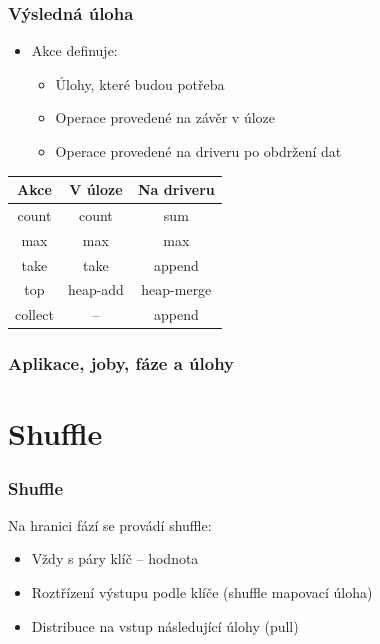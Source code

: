 \documentclass[xcolor=dvipsnames,compact]{beamer}
\begin{document}
\begin{frame}
	\frametitle{Výsledná úloha}
	\begin{itemize}
		\item Akce definuje:
		\begin{itemize}
			\item Úlohy, které budou potřeba
			\item Operace provedené na závěr v úloze
			\item Operace provedené na driveru po obdržení dat
		\end{itemize}
	\end{itemize}
	\begin{table}
		\begin{center}
			\begin{tabularx}{\linewidth}{ C | C | C }
				Akce & V úloze & Na driveru \\
				\hline
				count & count & sum \\
				max & max & max \\
				take & take & append \\
				top & heap-add & heap-merge \\ 
				collect & -- & append
			\end{tabularx}
		\end{center}
	\end{table}
\end{frame}

\begin{frame}
	\frametitle{Aplikace, joby, fáze a úlohy}
	\begin{center}
	\end{center}
\end{frame}

\section{Shuffle}

\begin{frame}
	\frametitle{Shuffle}	
	Na hranici fází se provádí shuffle:
	\begin{itemize}
		\item Vždy s páry klíč -- hodnota
		\item Roztřízení výstupu podle klíče (shuffle mapovací úloha)
		\item Distribuce na vstup následující úlohy (pull)
	\end{itemize}
\end{frame}
\end{document}

